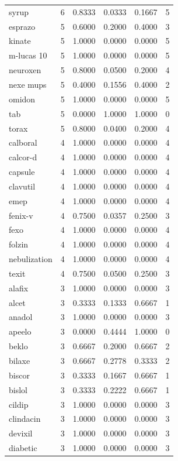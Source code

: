 \begin{longtable}{p{3.0cm}rrrrr}
syrup & 6 & 0.8333 & 0.0333 & 0.1667 & 5 \\
esprazo & 5 & 0.6000 & 0.2000 & 0.4000 & 3 \\
kinate & 5 & 1.0000 & 0.0000 & 0.0000 & 5 \\
m-lucas 10 & 5 & 1.0000 & 0.0000 & 0.0000 & 5 \\
neuroxen & 5 & 0.8000 & 0.0500 & 0.2000 & 4 \\
nexe mups & 5 & 0.4000 & 0.1556 & 0.4000 & 2 \\
omidon & 5 & 1.0000 & 0.0000 & 0.0000 & 5 \\
tab & 5 & 0.0000 & 1.0000 & 1.0000 & 0 \\
torax & 5 & 0.8000 & 0.0400 & 0.2000 & 4 \\
calboral & 4 & 1.0000 & 0.0000 & 0.0000 & 4 \\
calcor-d & 4 & 1.0000 & 0.0000 & 0.0000 & 4 \\
capsule & 4 & 1.0000 & 0.0000 & 0.0000 & 4 \\
clavutil & 4 & 1.0000 & 0.0000 & 0.0000 & 4 \\
emep & 4 & 1.0000 & 0.0000 & 0.0000 & 4 \\
fenix-v & 4 & 0.7500 & 0.0357 & 0.2500 & 3 \\
fexo & 4 & 1.0000 & 0.0000 & 0.0000 & 4 \\
folzin & 4 & 1.0000 & 0.0000 & 0.0000 & 4 \\
nebulization & 4 & 1.0000 & 0.0000 & 0.0000 & 4 \\
texit & 4 & 0.7500 & 0.0500 & 0.2500 & 3 \\
alafix & 3 & 1.0000 & 0.0000 & 0.0000 & 3 \\
alcet & 3 & 0.3333 & 0.1333 & 0.6667 & 1 \\
anadol & 3 & 1.0000 & 0.0000 & 0.0000 & 3 \\
apeelo & 3 & 0.0000 & 0.4444 & 1.0000 & 0 \\
beklo & 3 & 0.6667 & 0.2000 & 0.6667 & 2 \\
bilaxe & 3 & 0.6667 & 0.2778 & 0.3333 & 2 \\
biscor & 3 & 0.3333 & 0.1667 & 0.6667 & 1 \\
bislol & 3 & 0.3333 & 0.2222 & 0.6667 & 1 \\
cildip & 3 & 1.0000 & 0.0000 & 0.0000 & 3 \\
clindacin & 3 & 1.0000 & 0.0000 & 0.0000 & 3 \\
devixil & 3 & 1.0000 & 0.0000 & 0.0000 & 3 \\
diabetic & 3 & 1.0000 & 0.0000 & 0.0000 & 3 \\

\end{longtable}
